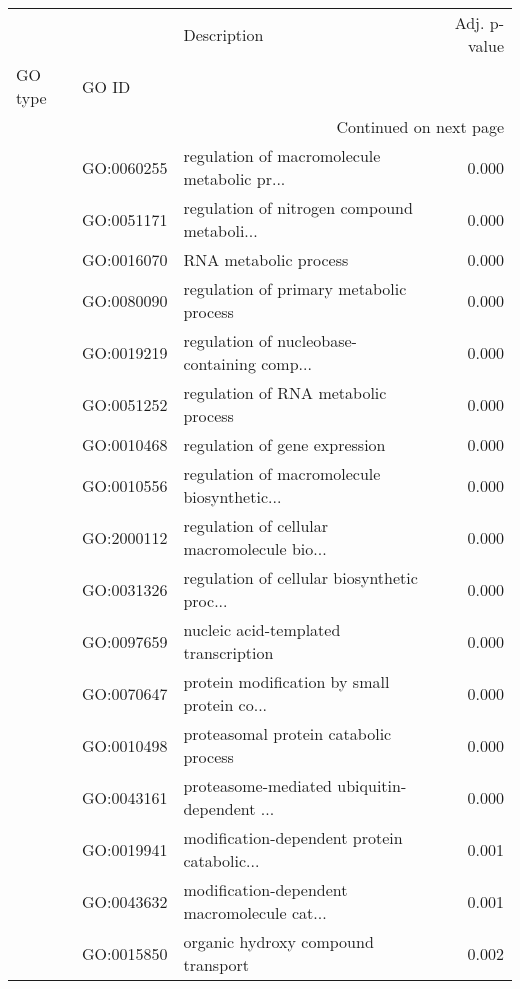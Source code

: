 \begin{longtable}{lllr}
\toprule
   &            &                                  Description &  Adj. p-value \\
GO type & GO ID &                                              &               \\
\midrule
\endhead
\midrule
\multicolumn{4}{r}{{Continued on next page}} \\
\midrule
\endfoot

\bottomrule
\endlastfoot
\multirow{52}{*}{BP} & GO:0060255 &  regulation of macromolecule metabolic pr... &         0.000 \\
   & GO:0051171 &  regulation of nitrogen compound metaboli... &         0.000 \\
   & GO:0016070 &                        RNA metabolic process &         0.000 \\
   & GO:0080090 &      regulation of primary metabolic process &         0.000 \\
   & GO:0019219 &  regulation of nucleobase-containing comp... &         0.000 \\
   & GO:0051252 &          regulation of RNA metabolic process &         0.000 \\
   & GO:0010468 &                regulation of gene expression &         0.000 \\
   & GO:0010556 &  regulation of macromolecule biosynthetic... &         0.000 \\
   & GO:2000112 &  regulation of cellular macromolecule bio... &         0.000 \\
   & GO:0031326 &  regulation of cellular biosynthetic proc... &         0.000 \\
   & GO:0097659 &         nucleic acid-templated transcription &         0.000 \\
   & GO:0070647 &  protein modification by small protein co... &         0.000 \\
   & GO:0010498 &        proteasomal protein catabolic process &         0.000 \\
   & GO:0043161 &  proteasome-mediated ubiquitin-dependent ... &         0.000 \\
   & GO:0019941 &  modification-dependent protein catabolic... &         0.001 \\
   & GO:0043632 &  modification-dependent macromolecule cat... &         0.001 \\
   & GO:0015850 &           organic hydroxy compound transport &         0.002 \\

\end{longtable}
